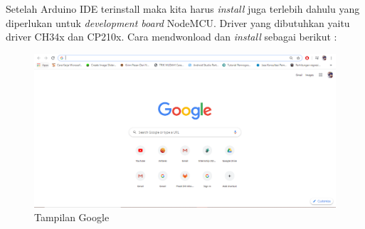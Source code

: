 \par Setelah Arduino IDE terinstall maka kita harus \textit{install} juga terlebih dahulu yang diperlukan untuk \textit{development board} NodeMCU. Driver yang dibutuhkan yaitu driver CH34x dan CP210x. Cara mendwonload dan \textit{install} sebagai berikut :
\begin{figure}[H]
\centering
\includegraphics[width=1\textwidth]{figures/google.png}
\caption{Tampilan Google }
\label{print}
\end{figure}

